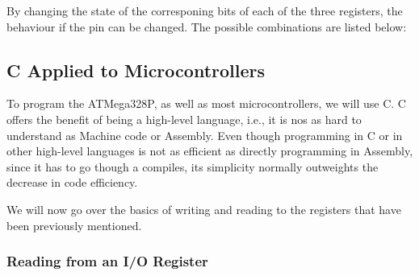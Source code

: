 By changing the state of the corresponing bits of each of the three registers, the behaviour if the pin can be changed. The possible combinations are listed below:


\begin{table}[htbp]
\end{table}


\clearpage

\subsection{C Applied to Microcontrollers}

To program the ATMega328P, as well as most microcontrollers, we will use C. C offers the benefit of being a high-level language, i.e., it is nos as hard to understand as Machine code or Assembly. Even though programming in C or in other high-level languages is not as efficient as directly programming in Assembly, since it has to go though a compiles, its simplicity normally outweights the decrease in code efficiency. \medskip

We will now go over the basics of writing and reading to the registers that have been previously mentioned.


\subsubsection{Reading from an I/O Register}

